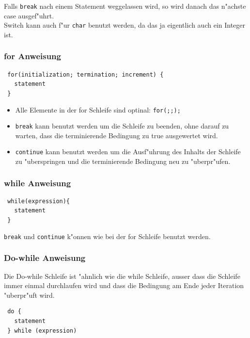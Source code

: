 \documentclass[german, 10pt, a4paper, twocolumn]{scrartcl}
\begin{document}
Falls \verb#break# nach einem Statement weggelassen wird, so wird danach das n"achste case ausgef"uhrt.\\

Switch kann auch f"ur \verb#char# benutzt werden, da das ja eigentlich auch ein Integer ist.

\subsubsection{for Anweisung}

\begin{verbatim}
 for(initialization; termination; increment) {
   statement
 }
\end{verbatim}

\begin{itemize}
	\item Alle Elemente in der for Schleife sind optinal: \verb#for(;;);#
	\item \verb#break# kann benutzt werden um die Schleife zu beenden, ohne darauf zu warten, dass die terminierende Bedingung zu true ausgewertet wird.
	\item \verb#continue# kann benutzt werden um die Ausf"uhrung des Inhalts der Schleife zu "uberspringen und die terminierende Bedingung neu zu "uberpr"ufen.
\end{itemize}

\subsubsection{while Anweisung}

\begin{verbatim}
 while(expression){
   statement
 }
\end{verbatim}

\verb#break# und \verb#continue# k"onnen wie bei der for Schleife benutzt werden.

\subsubsection{Do-while Anweisung}

Die Do-while Schleife ist "ahnlich wie die while Schleife, ausser dass die Schleife immer einmal durchlaufen wird und dass die Bedingung am Ende jeder Iteration "uberpr"uft wird.

\begin{verbatim}
 do {
   statement
 } while (expression)
\end{verbatim}
\end{document}

